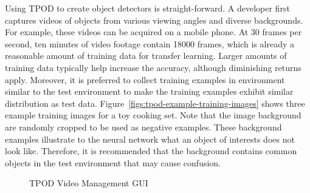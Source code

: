 Using TPOD to create object detectors is straight-forward. A developer first
captures videos of objects from various viewing angles and diverse backgrounds.
For example, these videos can be acquired on a mobile phone. At 30 frames per
second, ten minutes of video footage contain 18000 frames, which is already a
reasonable amount of training data for transfer learning. Larger amounts of
training data typically help increase the accuracy, although diminishing returns
apply. Moreover, it is preferred to collect training examples in environment
similar to the test environment to make the training examples exhibit similar
distribution as test data. Figure~\ref{figs:tpod-example-training-images} shows
three example training images for a toy cooking set. Note that the image
background are randomly cropped to be used as negative examples. These
background examples illustrate to the neural network what an object of interests
does not look like. Therefore, it is recommended that the background contains
common objects in the test environment that may cause confusion.


\begin{figure}[]
  \centering
    \caption{TPOD Video Management GUI}
  \label{figs:tpod-video-gui}
\end{figure}


